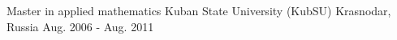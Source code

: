 

\begin{cventries}

  \cvsentry
    {Master in applied mathematics} %
    {Kuban State University (KubSU)} %
    {Krasnodar, Russia} %
    {Aug. 2006 - Aug. 2011} %

\end{cventries}
